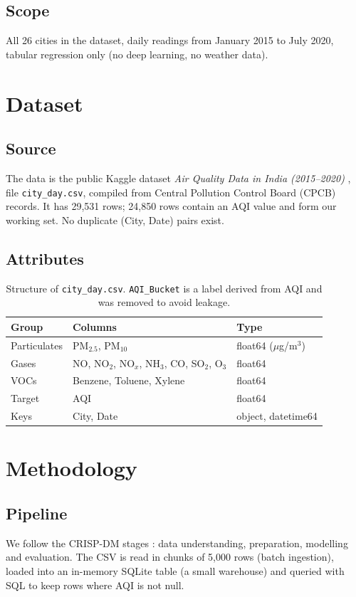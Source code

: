 \documentclass[11pt,a4paper]{article}
\begin{document}
\subsection{Scope}
All 26 cities in the dataset, daily readings from January 2015 to July 2020, tabular regression only (no deep learning, no weather data).

\section{Dataset}
\subsection{Source}
The data is the public Kaggle dataset \emph{Air Quality Data in India (2015--2020)} \cite{kaggle}, file \texttt{city\_day.csv}, compiled from Central Pollution Control Board (CPCB) records. It has 29{,}531 rows; 24{,}850 rows contain an AQI value and form our working set. No duplicate (City, Date) pairs exist.

\subsection{Attributes}
\begin{table}[H]
\centering
\begin{tabular}{@{}lll@{}}
\toprule
Group & Columns & Type \\ \midrule
Particulates & PM$_{2.5}$, PM$_{10}$ & float64 ($\mu$g/m$^3$) \\
Gases & NO, NO$_2$, NO$_x$, NH$_3$, CO, SO$_2$, O$_3$ & float64 \\
VOCs & Benzene, Toluene, Xylene & float64 \\
Target & AQI & float64 \\
Keys & City, Date & object, datetime64 \\ \bottomrule
\end{tabular}
\caption{Structure of \texttt{city\_day.csv}. \texttt{AQI\_Bucket} is a label derived from AQI and was removed to avoid leakage.}
\end{table}

\section{Methodology}
\subsection{Pipeline}
We follow the CRISP-DM stages \cite{crisp}: data understanding, preparation, modelling and evaluation. The CSV is read in chunks of 5{,}000 rows (batch ingestion), loaded into an in-memory SQLite table (a small warehouse) and queried with SQL to keep rows where AQI is not null.
\end{document}

